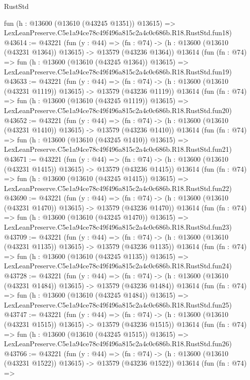\begin{lexlean}{RustStd}
\begin{coremodule}
    fun (h : @13600 (@13610 (@43245 @1351)) @13615) =>
    LexLeanPreserve.C5e1a94ce78c49f496a815c2a4c0c686b.R18.RustStd.fun18)
@43614 := @43221
    (fun (y : @44) =>
    (fn : @74) -> (h : @13600 (@13610 (@43231 @1364)) @13615) -> @13579 (@43236 @1364))
    @13614
    (fun (fn : @74) =>
    fun (h : @13600 (@13610 (@43245 @1364)) @13615) =>
    LexLeanPreserve.C5e1a94ce78c49f496a815c2a4c0c686b.R18.RustStd.fun19)
@43633 := @43221
    (fun (y : @44) =>
    (fn : @74) -> (h : @13600 (@13610 (@43231 @1119)) @13615) -> @13579 (@43236 @1119))
    @13614
    (fun (fn : @74) =>
    fun (h : @13600 (@13610 (@43245 @1119)) @13615) =>
    LexLeanPreserve.C5e1a94ce78c49f496a815c2a4c0c686b.R18.RustStd.fun20)
@43652 := @43221
    (fun (y : @44) =>
    (fn : @74) -> (h : @13600 (@13610 (@43231 @1410)) @13615) -> @13579 (@43236 @1410))
    @13614
    (fun (fn : @74) =>
    fun (h : @13600 (@13610 (@43245 @1410)) @13615) =>
    LexLeanPreserve.C5e1a94ce78c49f496a815c2a4c0c686b.R18.RustStd.fun21)
@43671 := @43221
    (fun (y : @44) =>
    (fn : @74) -> (h : @13600 (@13610 (@43231 @1415)) @13615) -> @13579 (@43236 @1415))
    @13614
    (fun (fn : @74) =>
    fun (h : @13600 (@13610 (@43245 @1415)) @13615) =>
    LexLeanPreserve.C5e1a94ce78c49f496a815c2a4c0c686b.R18.RustStd.fun22)
@43690 := @43221
    (fun (y : @44) =>
    (fn : @74) -> (h : @13600 (@13610 (@43231 @1470)) @13615) -> @13579 (@43236 @1470))
    @13614
    (fun (fn : @74) =>
    fun (h : @13600 (@13610 (@43245 @1470)) @13615) =>
    LexLeanPreserve.C5e1a94ce78c49f496a815c2a4c0c686b.R18.RustStd.fun23)
@43709 := @43221
    (fun (y : @44) =>
    (fn : @74) -> (h : @13600 (@13610 (@43231 @1135)) @13615) -> @13579 (@43236 @1135))
    @13614
    (fun (fn : @74) =>
    fun (h : @13600 (@13610 (@43245 @1135)) @13615) =>
    LexLeanPreserve.C5e1a94ce78c49f496a815c2a4c0c686b.R18.RustStd.fun24)
@43728 := @43221
    (fun (y : @44) =>
    (fn : @74) -> (h : @13600 (@13610 (@43231 @1484)) @13615) -> @13579 (@43236 @1484))
    @13614
    (fun (fn : @74) =>
    fun (h : @13600 (@13610 (@43245 @1484)) @13615) =>
    LexLeanPreserve.C5e1a94ce78c49f496a815c2a4c0c686b.R18.RustStd.fun25)
@43747 := @43221
    (fun (y : @44) =>
    (fn : @74) -> (h : @13600 (@13610 (@43231 @1515)) @13615) -> @13579 (@43236 @1515))
    @13614
    (fun (fn : @74) =>
    fun (h : @13600 (@13610 (@43245 @1515)) @13615) =>
    LexLeanPreserve.C5e1a94ce78c49f496a815c2a4c0c686b.R18.RustStd.fun26)
@43766 := @43221
    (fun (y : @44) =>
    (fn : @74) -> (h : @13600 (@13610 (@43231 @1522)) @13615) -> @13579 (@43236 @1522))
    @13614
    (fun (fn : @74) =>

\end{coremodule}
\end{lexlean}
